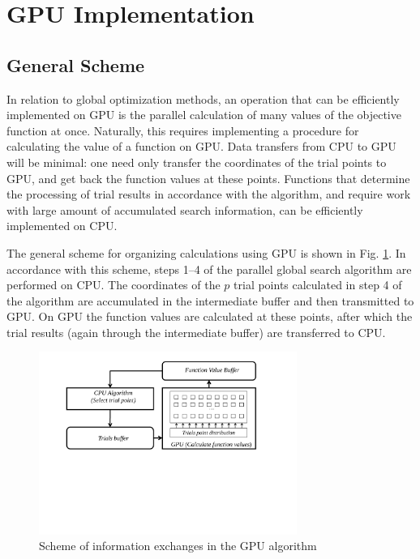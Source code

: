 \documentclass{svproc}
\begin{document}
\section{GPU Implementation}

\subsection{General Scheme}

In relation to global optimization methods, an operation that can be efficiently implemented on GPU is the parallel calculation of many values of the objective function at once. Naturally, this requires implementing a procedure for calculating the value of a function on GPU. Data transfers from CPU to GPU will be minimal: one need only transfer the coordinates of the trial points to GPU, and get back the function values at these points. Functions that determine the processing of trial results in accordance with the algorithm, and require work with large amount of accumulated search information, can be efficiently implemented on CPU.

The general scheme for organizing calculations using GPU is shown in Fig. \ref{fig:GPU_Algorithm}. In accordance with this scheme, steps 1--4 of the parallel global search algorithm are performed on CPU. The coordinates of the $p$ trial points calculated in step 4 of the algorithm are accumulated in the intermediate buffer and then transmitted to GPU. On GPU the function values are calculated at these points, after which the trial results (again through the intermediate buffer) are transferred to CPU.
   
   \begin{figure}[t]
    \centering
		\includegraphics[width=0.75\textwidth]{GPU_Algorithm.pdf}
		\caption{Scheme of information exchanges in the GPU algorithm}\label{fig:GPU_Algorithm}
\end{figure}
\end{document}
